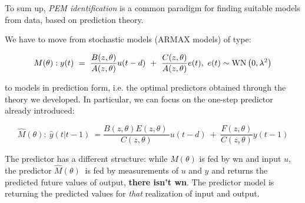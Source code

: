 

To sum up, \textit{PEM identification} is a common paradigm for finding suitable models from data, based on prediction theory.

We have to move from stochastic models (ARMAX models) of type: 

$$
M(\theta):
y(t) \ =\ \frac{B(z,\theta)}{A(z,\theta)} u(t-d) \ +\ \frac{C(z,\theta)}{A(z,\theta)} e(t) ,\ e(t)\sim \WN \left(0,\lambda ^{2}\right)
$$

to models in prediction form, i.e. the optimal predictors obtained through the theory we developed. In particular, we can focus on the one-step predictor already introduced:

$$
\hat{M}(\theta) :
\ \hat{y}(t|t-1) \ =\frac{B(z,\theta) E(z,\theta) \ }{C(z,\theta)} u(t-d) \ +\ \frac{F(z,\theta)}{C(z,\theta)} y(t-1)
$$

The predictor has a different structure: while $ M(\theta)$ is fed by \gls{wn} and input $ u$, the predictor $ \hat{M}(\theta) \ $ is fed by measurements of $ u$ and $ y$ and returns the predicted future values of output, \textbf{there isn't \gls{wn}}. The predictor model is returning the predicted values for \textit{that} realization of input and output.



